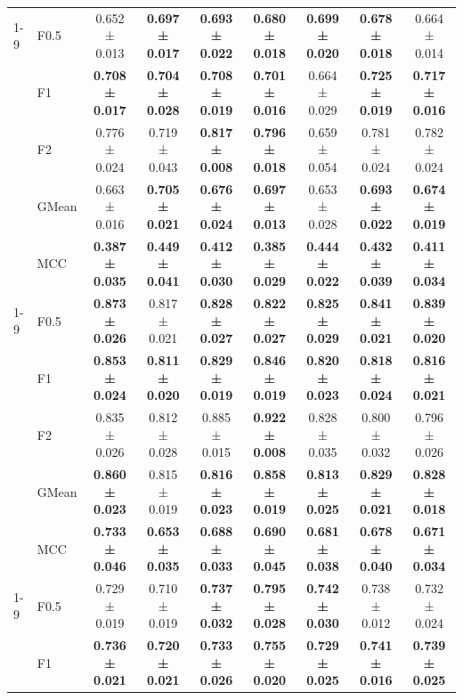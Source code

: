 \begin{table}[H]
{\begin{tabular}{llccccccc}
\cline{1-9}
\multirow[t]{5}{*}{GaussianNB} & F0.5 & 0.652 ± 0.013 & \textbf{0.697 ± 0.017} & \textbf{0.693 ± 0.022} & \textbf{0.680 ± 0.018} & \textbf{0.699 ± 0.020} & \textbf{0.678 ± 0.018} & 0.664 ± 0.014 \\
 & F1 & \textbf{0.708 ± 0.017} & \textbf{0.704 ± 0.028} & \textbf{0.708 ± 0.019} & \textbf{0.701 ± 0.016} & 0.664 ± 0.029 & \textbf{0.725 ± 0.019} & \textbf{0.717 ± 0.016} \\
 & F2 & 0.776 ± 0.024 & 0.719 ± 0.043 & \textbf{0.817 ± 0.008} & \textbf{0.796 ± 0.018} & 0.659 ± 0.054 & 0.781 ± 0.024 & 0.782 ± 0.024 \\
 & GMean & 0.663 ± 0.016 & \textbf{0.705 ± 0.021} & \textbf{0.676 ± 0.024} & \textbf{0.697 ± 0.013} & 0.653 ± 0.028 & \textbf{0.693 ± 0.022} & \textbf{0.674 ± 0.019} \\
 & MCC & \textbf{0.387 ± 0.035} & \textbf{0.449 ± 0.041} & \textbf{0.412 ± 0.030} & \textbf{0.385 ± 0.029} & \textbf{0.444 ± 0.022} & \textbf{0.432 ± 0.039} & \textbf{0.411 ± 0.034} \\
\cline{1-9}
\multirow[t]{5}{*}{LGBM()} & F0.5 & \textbf{0.873 ± 0.026} & 0.817 ± 0.021 & \textbf{0.828 ± 0.027} & \textbf{0.822 ± 0.027} & \textbf{0.825 ± 0.029} & \textbf{0.841 ± 0.021} & \textbf{0.839 ± 0.020} \\
 & F1 & \textbf{0.853 ± 0.024} & \textbf{0.811 ± 0.020} & \textbf{0.829 ± 0.019} & \textbf{0.846 ± 0.019} & \textbf{0.820 ± 0.023} & \textbf{0.818 ± 0.024} & \textbf{0.816 ± 0.021} \\
 & F2 & 0.835 ± 0.026 & 0.812 ± 0.028 & 0.885 ± 0.015 & \textbf{0.922 ± 0.008} & 0.828 ± 0.035 & 0.800 ± 0.032 & 0.796 ± 0.026 \\
 & GMean & \textbf{0.860 ± 0.023} & 0.815 ± 0.019 & \textbf{0.816 ± 0.023} & \textbf{0.858 ± 0.019} & \textbf{0.813 ± 0.025} & \textbf{0.829 ± 0.021} & \textbf{0.828 ± 0.018} \\
 & MCC & \textbf{0.733 ± 0.046} & \textbf{0.653 ± 0.035} & \textbf{0.688 ± 0.033} & \textbf{0.690 ± 0.045} & \textbf{0.681 ± 0.038} & \textbf{0.678 ± 0.040} & \textbf{0.671 ± 0.034} \\
\cline{1-9}
\multirow[t]{5}{*}{LogisticRegression()} & F0.5 & 0.729 ± 0.019 & 0.710 ± 0.019 & \textbf{0.737 ± 0.032} & \textbf{0.795 ± 0.028} & \textbf{0.742 ± 0.030} & 0.738 ± 0.012 & 0.732 ± 0.024 \\
 & F1 & \textbf{0.736 ± 0.021} & \textbf{0.720 ± 0.021} & \textbf{0.733 ± 0.026} & \textbf{0.755 ± 0.020} & \textbf{0.729 ± 0.025} & \textbf{0.741 ± 0.016} & \textbf{0.739 ± 0.025} \\

\end{tabular}}
\end{table}
